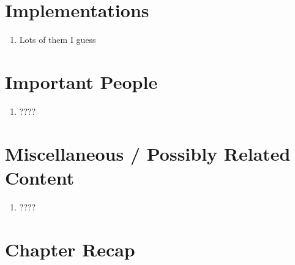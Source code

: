 \documentclass[thesis-solanki.tex]{subfiles}
\begin{document}
\section{Implementations}
\begin{enumerate}
\item Lots of them I guess
\end{enumerate}

\section{Important People}
\begin{enumerate}
\item ????
\end{enumerate}

\section{Miscellaneous / Possibly Related Content}
\begin{enumerate}
\item ????
\end{enumerate}


\section{Chapter Recap}
\end{document}
